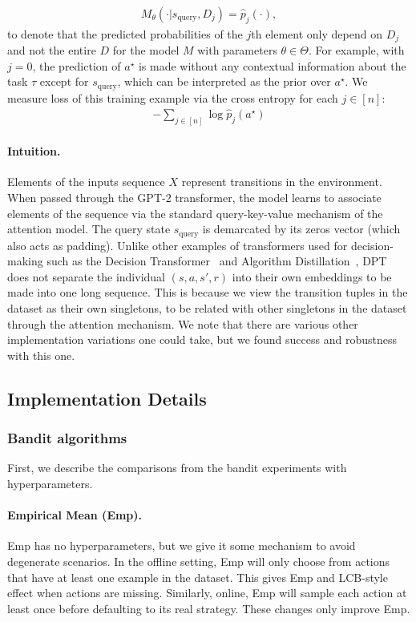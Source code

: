 \documentclass{article}
\newcommand{\squery}{s_{\text{query}}}
\begin{document}
\begin{align}
    M_{\theta}(\cdot | \squery, D_j) = \hat p_j(\cdot),
\end{align}
to denote that the predicted probabilities of the $j$th element only depend on $D_j$ and not the entire $D$ for the model $M$ with parameters $\theta \in \Theta$. For example, with $j = 0$, the prediction of $a^\star$ is made without any contextual information about the task $\tau$ except for $\squery$, which can be interpreted as the prior over $a^\star$.
We measure loss of this training example via the cross entropy for each $j \in [n]$:
\begin{align}\label{eq:app-loss}
-\sum_{j \in [n]} \log \hat p_{j}(a^\star)
\end{align}
\paragraph{Intuition.} Elements of the inputs sequence $X$ represent transitions in the environment. When passed through the GPT-2 transformer, the model learns to associate elements of the sequence via the standard query-key-value mechanism of the attention model. The query state $\squery$ is demarcated by its zeros vector (which also acts as padding). Unlike other examples of transformers used for decision-making such as the Decision Transformer~\citep{chen2021decision} and Algorithm Distillation~\citep{laskin2022context}, DPT does not separate the individual $(s, a, s', r)$ into their own embeddings to be made into one long sequence. This is because we view the transition tuples in the dataset as their own singletons, to be related with other singletons in the dataset through the attention mechanism. We note that there are various other implementation variations one could take, but we found success and robustness with this one.
\subsection{Implementation Details}
\label{app:comparisons}
\subsubsection{Bandit algorithms}
First, we describe the comparisons from the bandit experiments with hyperparameters.
\paragraph{Empirical Mean (Emp).} Emp has no hyperparameters, but we give it some mechanism to avoid degenerate scenarios.  In the offline setting, Emp will only choose from actions that have at least one example in the dataset. This gives Emp and LCB-style effect when actions are missing. Similarly, online, Emp will sample each action at least once before defaulting to its real strategy. These changes only improve Emp.
\end{document}
